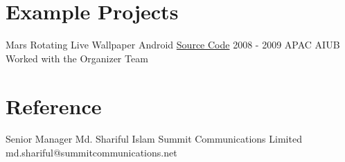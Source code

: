 \documentclass[]{cv-style} %
\begin{document}
\section{Example Projects}
\begin{entrylist}
\entry
{}
{Mars Rotating Live Wallpaper}
{Android}
{\href{https://git.covolunablu.org/portaloffreedom/MarsWallpaper}{Source Code}}
\entry
{2008 - 2009}
{APAC}
{AIUB}
{Worked with the Organizer Team}
\end{entrylist}

\section{Reference}
\begin{entrylist}
\entry
{Senior Manager}
{Md. Shariful Islam}
{Summit Communications Limited}
{md.shariful@summitcommunications.net}
\end{entrylist}
\end{document}
